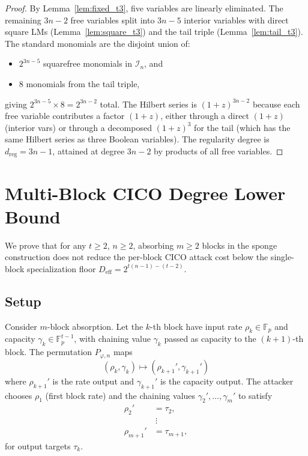 \documentclass[a4paper,11pt]{article}
\newcommand{\Fp}{\mathbb{F}_p}
\begin{document}
\begin{proof}
By Lemma~\ref{lem:fixed_t3}, five variables are linearly eliminated.
The remaining $3n-2$ free variables split into $3n-5$ interior variables
with direct square LMs (Lemma~\ref{lem:square_t3}) and the tail triple
(Lemma~\ref{lem:tail_t3}). The standard monomials are the disjoint union
of:
\begin{itemize}
  \item $2^{3n-5}$ squarefree monomials in $\mathcal{I}_n$, and
  \item $8$ monomials from the tail triple,
\end{itemize}
giving $2^{3n-5} \times 8 = 2^{3n-2}$ total. The Hilbert series is
$(1+z)^{3n-2}$ because each free variable contributes a factor
$(1+z)$, either through a direct $(1+z)$ (interior vars) or through
a decomposed $(1+z)^3$ for the tail (which has the same Hilbert
series as three Boolean variables). The regularity degree is
$d_{\mathrm{reg}} = 3n-1$, attained at degree $3n-2$ by products of
all free variables.
\end{proof}

\section{Multi-Block CICO Degree Lower Bound}\label{sec:multiblock}

We prove that for any $t \ge 2$, $n \ge 2$, absorbing $m \ge 2$ blocks
in the sponge construction does not reduce the per-block CICO attack
cost below the single-block specialization floor
$D_{\mathrm{eff}} = 2^{t(n-1)-(t-2)}$.

\subsection{Setup}

Consider $m$-block absorption. Let the $k$-th block have input rate
$\rho_k \in \Fp$ and capacity $\gamma_k \in \Fp^{t-1}$, with
chaining value $\gamma_k$ passed as capacity to the $(k+1)$-th block.
The permutation $P_{\varphi,n}$ maps
\[
(\rho_k, \gamma_k) \mapsto (\rho_{k+1}', \gamma_{k+1}')
\]
where $\rho_{k+1}'$ is the rate output and $\gamma_{k+1}'$ is the
capacity output. The attacker chooses $\rho_1$ (first block rate) and
the chaining values $\gamma_2',\dots,\gamma_m'$ to satisfy
\begin{align*}
\rho_2' &= \tau_2,\\
&\ \vdots\\
\rho_{m+1}' &= \tau_{m+1},
\end{align*}
for output targets $\tau_k$.
\end{document}
